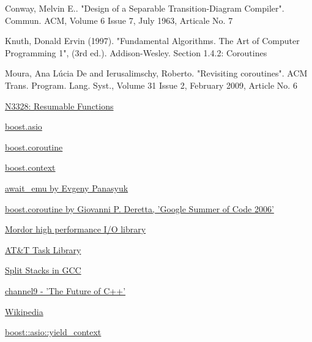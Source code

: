 \begin{thebibliography}{99}

        {Conway, Melvin E.. "Design of a Separable Transition-Diagram Compiler".
         Commun. ACM, Volume 6 Issue 7, July 1963, Articale No. 7}

        {Knuth, Donald Ervin (1997). "Fundamental Algorithms. The Art of Computer Programming 1", (3rd ed.).
         Addison-Wesley. Section 1.4.2: Coroutines}

        {Moura, Ana L\'{u}cia De and Ierusalimschy, Roberto. "Revisiting coroutines".
         ACM Trans. Program. Lang. Syst., Volume 31 Issue 2, February 2009, Article No. 6}

        \href{http://www.open-std.org/jtc1/sc22/wg21/docs/papers/2012/n3328.pdf}
        {N3328: Resumable Functions}

        \href{http://www.boost.org/doc/libs/1_54_0/doc/html/boost_asio.html}
        {boost.asio}

        \href{http://www.boost.org/doc/libs/1_54_0/libs/coroutine/doc/html/index.html}
        {boost.coroutine}

        \href{http://www.boost.org/doc/libs/1_54_0/libs/context/doc/html/index.html}
        {boost.context}

        \href{http://github.com/panaseleus/await_emu}
        {await\_emu by Evgeny Panasyuk}

        \href{http://www.crystalclearsoftware.com/soc/coroutine/}
        {boost.coroutine by Giovanni P. Deretta, 'Google Summer of Code 2006'}

        \href{http://code.mozy.com/projects/mordor}
        {Mordor high performance I/O library}

        \href{http://www.softwarepreservation.org/projects/c_plus_plus/cfront/release_2.0/doc/LibraryManual.pdf}
        {AT\&T Task Library}

        \href{http://gcc.gnu.org/wiki/SplitStacks}
        {Split Stacks in GCC}

        \href{http://channel9.msdn.com/Events/Build/2013/2-306#c635084523858527973}
        {channel9 - 'The Future of C++'}

        \href{http://en.wikipedia.org/wiki/Coroutine#Programming_languages_with_native_support}
        {Wikipedia}

        \href{http://www.boost.org/doc/libs/1_54_0/doc/html/boost_asio/reference/yield_context.html}
        {boost::asio::yield\_context}

\end{thebibliography}

